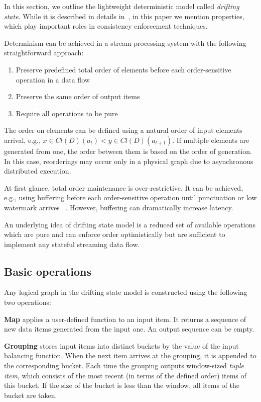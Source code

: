 
\label {fs-model-section}

In this section, we outline the lightweight deterministic model called {\em drifting state}. While it is described in details in~\cite{we2018adbis}, in this paper we mention properties, which play important roles in consistency enforcement techniques.

Determinism can be achieved in a stream processing system with the following straightforward approach:
\begin{enumerate}
    \item Preserve predefined total order of elements before each order-sensitive operation in a data flow
    \item Preserve the same order of output items
    \item Require all operations to be pure
\end{enumerate}

The order on elements can be defined using a natural order of input elements arrival, e.g., $x\in Cl(D)(a_t) < y\in Cl(D)(a_{t+1})$. If multiple elements are generated from one, the order between them is based on the order of generation. In this case, reorderings may occur only in a physical graph due to asynchronous distributed execution.

At first glance, total order maintenance is over-restrictive. It can be achieved, e.g., using buffering before each order-sensitive operation until punctuation or low watermark arrives ~\cite{Li:2008:OPN:1453856.1453890}. However, buffering can dramatically increase latency.

An underlying idea of drifting state model is a reduced set of available operations which are pure and can enforce order optimistically but are sufficient to implement any stateful streaming data flow. 
\subsection{Basic operations}

Any logical graph in the drifting state model is constructed using the following two operations:

{\bf Map} applies a user-defined function to an input item. It returns a sequence of new data items generated from the input one. An output sequence can be empty.

{\bf Grouping} stores input items into distinct buckets by the value of the input balancing function. When the next item arrives at the grouping, it is appended to the corresponding bucket. Each time the grouping outputs window-sized {\it tuple item}, which consists of the most recent (in terms of the defined order) items of this bucket. If the size of the bucket is less than the window, all items of the bucket are taken.

